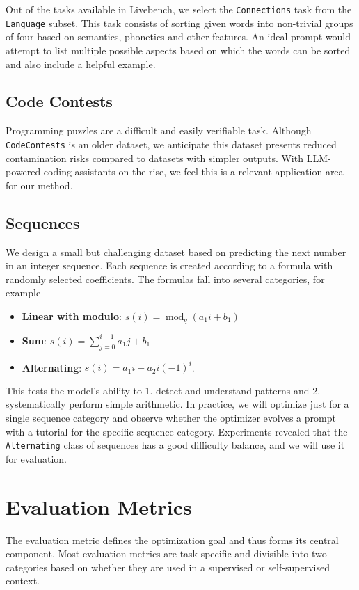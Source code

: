 Out of the tasks available in Livebench, we select the \texttt{Connections} task from the \texttt{Language} subset. 
This task consists of sorting given words into non-trivial groups of four based on semantics, phonetics and other features. 
An ideal prompt would attempt to list multiple possible aspects based on which the words can be sorted and also include a helpful example.

\subsection{Code Contests}
Programming puzzles are a difficult and easily verifiable task. Although \texttt{CodeContests}\cite{li2022competition} is an older dataset, 
we anticipate this dataset presents reduced contamination risks compared to datasets with simpler outputs. With LLM-powered coding assistants on the rise, we
feel this is a relevant application area for our method. 

\subsection{Sequences}
We design a small but challenging dataset based on predicting the next number in an integer sequence.
Each sequence is created according to a formula with randomly selected coefficients. The formulas fall into several categories, for example
\begin{itemize}
    \item \textbf{Linear with modulo}: $s(i) = \operatorname{mod}_{q}(a_{1} i + b_{1})$
    \item \textbf{Sum}: $s(i) = \sum_{j=0}^{i-1}a_{1} j + b_{1}$
    \item \textbf{Alternating}: $s(i) = a_{1}i + a_{2}i(-1)^{i}$.
\end{itemize}
This tests the model's ability to 1. detect and understand patterns and 2. systematically perform simple arithmetic. 
In practice, we will optimize just for a single sequence category and observe whether the optimizer evolves a prompt with a tutorial for the specific sequence category.
Experiments revealed that the \texttt{Alternating} class of sequences has a good difficulty balance, and we will use it for evaluation.

\section{Evaluation Metrics}
The evaluation metric defines the optimization goal and thus forms its central component. 
Most evaluation metrics are task-specific and divisible into two categories based on whether they are used in a supervised or self-supervised context.
